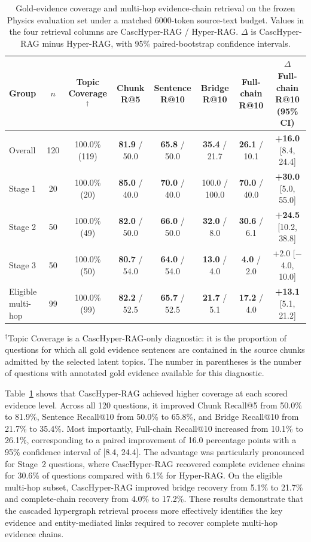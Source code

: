 \documentclass[a4paper,fleqn]{cas-dc}
\begin{document}
\begin{table}[t]
\centering
\caption{Gold-evidence coverage and multi-hop evidence-chain retrieval on the frozen Physics evaluation set under a matched 6000-token source-text budget. Values in the four retrieval columns are CascHyper-RAG / Hyper-RAG. $\Delta$ is CascHyper-RAG minus Hyper-RAG, with 95\% paired-bootstrap confidence intervals.}
\label{tab:rq6_evidence_chain_retrieval}
\setlength{\tabcolsep}{4pt}
\scriptsize
\begin{tabular}{lccccccc}
\toprule
Group & $n$ & Topic Coverage$^{\dagger}$ & Chunk R@5 & Sentence R@10 & Bridge R@10 & Full-chain R@10 & $\Delta$ Full-chain R@10 (95\% CI) \\
\midrule
Overall & 120 & 100.0\% (119) & \textbf{81.9} / 50.0 & \textbf{65.8} / 50.0 & \textbf{35.4} / 21.7 & \textbf{26.1} / 10.1 & \textbf{+16.0} [8.4, 24.4] \\
Stage 1 & 20 & 100.0\% (20) & \textbf{85.0} / 40.0 & \textbf{70.0} / 40.0 & 100.0 / 100.0 & \textbf{70.0} / 40.0 & \textbf{+30.0} [5.0, 55.0] \\
Stage 2 & 50 & 100.0\% (49) & \textbf{82.0} / 50.0 & \textbf{66.0} / 50.0 & \textbf{32.0} / 8.0 & \textbf{30.6} / 6.1 & \textbf{+24.5} [10.2, 38.8] \\
Stage 3 & 50 & 100.0\% (50) & \textbf{80.7} / 54.0 & \textbf{64.0} / 54.0 & \textbf{13.0} / 4.0 & \textbf{4.0} / 2.0 & +2.0 [$-$4.0, 10.0] \\
Eligible multi-hop & 99 & 100.0\% (99) & \textbf{82.2} / 52.5 & \textbf{65.7} / 52.5 & \textbf{21.7} / 5.1 & \textbf{17.2} / 4.0 & \textbf{+13.1} [5.1, 21.2] \\
\bottomrule
\end{tabular}

\vspace{2pt}
\raggedright\scriptsize $^{\dagger}$Topic Coverage is a CascHyper-RAG-only diagnostic: it is the proportion of questions for which all gold evidence sentences are contained in the source chunks admitted by the selected latent topics. The number in parentheses is the number of questions with annotated gold evidence available for this diagnostic.
\end{table}

Table~\ref{tab:rq6_evidence_chain_retrieval} shows that CascHyper-RAG achieved higher coverage at each scored evidence level. Across all 120 questions, it improved Chunk Recall@5 from 50.0\% to 81.9\%, Sentence Recall@10 from 50.0\% to 65.8\%, and Bridge Recall@10 from 21.7\% to 35.4\%. Most importantly, Full-chain Recall@10 increased from 10.1\% to 26.1\%, corresponding to a paired improvement of 16.0 percentage points with a 95\% confidence interval of [8.4, 24.4]. The advantage was particularly pronounced for Stage~2 questions, where CascHyper-RAG recovered complete evidence chains for 30.6\% of questions compared with 6.1\% for Hyper-RAG. On the eligible multi-hop subset, CascHyper-RAG improved bridge recovery from 5.1\% to 21.7\% and complete-chain recovery from 4.0\% to 17.2\%. These results demonstrate that the cascaded hypergraph retrieval process more effectively identifies the key evidence and entity-mediated links required to recover complete multi-hop evidence chains.
\end{document}
